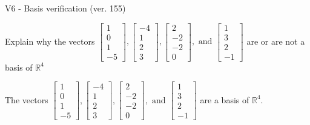 \begin{exercise}
  \begin{exerciseTitle}V6 - Basis verification (ver. 155)\end{exerciseTitle}
  \begin{exerciseStatement}
    Explain why the vectors \(\left[\begin{array}{r}
1 \\
0 \\
1 \\
-5
\end{array}\right] , \left[\begin{array}{r}
-4 \\
1 \\
2 \\
3
\end{array}\right] , \left[\begin{array}{r}
2 \\
-2 \\
-2 \\
0
\end{array}\right] , \text{ and } \left[\begin{array}{r}
1 \\
3 \\
2 \\
-1
\end{array}\right]\) are or are not a basis of \(\mathbb{R}^4\)	


  \end{exerciseStatement}
  \begin{exerciseAnswer}
   The vectors \(\left[\begin{array}{r}
1 \\
0 \\
1 \\
-5
\end{array}\right] , \left[\begin{array}{r}
-4 \\
1 \\
2 \\
3
\end{array}\right] , \left[\begin{array}{r}
2 \\
-2 \\
-2 \\
0
\end{array}\right] , \text{ and } \left[\begin{array}{r}
1 \\
3 \\
2 \\
-1
\end{array}\right]\) 
  	 are  a basis of \(\mathbb{R}^4\).
  


  \end{exerciseAnswer}
\end{exercise}